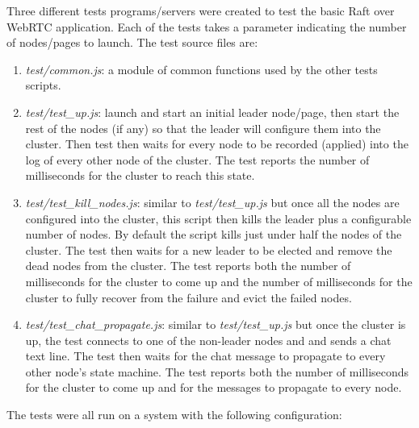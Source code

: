 \documentclass[conference,compsoc]{./IEEEtran/IEEEtran}
\begin{document}
Three different tests programs/servers were created to test the basic
Raft over WebRTC application. Each of the tests takes a parameter
indicating the number of nodes/pages to launch. The test source files
are:

\begin{enumerate}
    \item \emph{test/common.js}: a module of common functions used by
        the other tests scripts.
    \item \emph{test/test\_up.js}: launch and start an initial leader
        node/page, then start the rest of the nodes (if any) so that
        the leader will configure them into the cluster. Then test
        then waits for every node to be recorded (applied) into the
        log of every other node of the cluster. The test reports the
        number of milliseconds for the cluster to reach this state.
    \item \emph{test/test\_kill\_nodes.js}: similar to
        \emph{test/test\_up.js} but once all the nodes are configured
        into the cluster, this script then kills the leader plus
        a configurable number of nodes. By default the script kills
        just under half the nodes of the cluster. The test then waits
        for a new leader to be elected and remove the dead nodes from
        the cluster. The test reports both the number of milliseconds
        for the cluster to come up and the number of milliseconds for
        the cluster to fully recover from the failure and evict the
        failed nodes.
    \item \emph{test/test\_chat\_propagate.js}: similar to
        \emph{test/test\_up.js} but once the cluster is up, the test
        connects to one of the non-leader nodes and and sends a chat
        text line. The test then waits for the chat message to
        propagate to every other node's state machine. The test
        reports both the number of milliseconds for the cluster to
        come up and for the messages to propagate to every node.
\end{enumerate}

\ifdefined\OPTIONAL
The tests were all run on a system with the following configuration:
\end{document}
